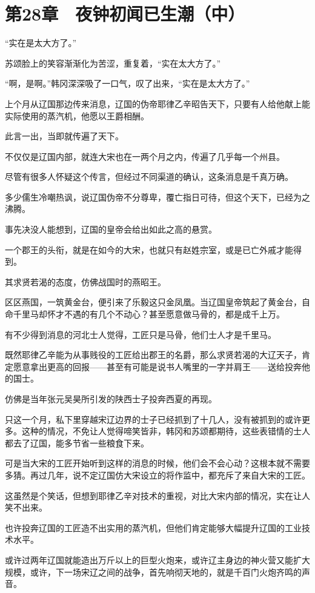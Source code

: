 \section{第28章　夜钟初闻已生潮（中）}

“实在是太大方了。”

苏颂脸上的笑容渐渐化为苦涩，重复着，“实在太大方了。”

“啊，是啊。”韩冈深深吸了一口气，叹了出来，“实在是太大方了。”

上个月从辽国那边传来消息，辽国的伪帝耶律乙辛昭告天下，只要有人给他献上能实际使用的蒸汽机，他愿以王爵相酬。

此言一出，当即就传遍了天下。

不仅仅是辽国内部，就连大宋也在一两个月之内，传遍了几乎每一个州县。

尽管有很多人怀疑这个传言，但经过不同渠道的确认，这条消息是千真万确。

多少儒生冷嘲热讽，说辽国伪帝不分尊卑，覆亡指日可待，但这个天下，已经为之沸腾。

事先决没人能想到，辽国的皇帝会给出如此之高的悬赏。

一个郡王的头衔，就是在如今的大宋，也就只有赵姓宗室，或是已亡外戚才能得到。

其求贤若渴的态度，仿佛战国时的燕昭王。

区区燕国，一筑黄金台，便引来了乐毅这只金凤凰。当辽国皇帝筑起了黄金台，自命千里马却怀才不遇的有几个不动心？甚至愿意做马骨的，都是成千上万。

有不少得到消息的河北士人觉得，工匠只是马骨，他们士人才是千里马。

既然耶律乙辛能为从事贱役的工匠给出郡王的名爵，那么求贤若渴的大辽天子，肯定愿意拿出更高的回报——甚至有可能是说书人嘴里的一字并肩王——送给投奔他的国士。

仿佛是当年张元吴昊所引发的陕西士子投奔西夏的再现。

只这一个月，私下里穿越宋辽边界的士子已经抓到了十几人，没有被抓到的或许更多。这种的情况，不免让人觉得啼笑皆非，韩冈和苏颂都期待，这些表错情的士人都去了辽国，能多节省一些粮食下来。

可是当大宋的工匠开始听到这样的消息的时候，他们会不会心动？这根本就不需要多猜。再过几年，说不定辽国仿大宋设立的将作监中，都充斥了来自大宋的工匠。

这虽然是个笑话，但想到耶律乙辛对技术的重视，对比大宋内部的情况，实在让人笑不出来。

也许投奔辽国的工匠造不出实用的蒸汽机，但他们肯定能够大幅提升辽国的工业技术水平。

或许过两年辽国就能造出万斤以上的巨型火炮来，或许辽主身边的神火营又能扩大规模，或许，下一场宋辽之间的战争，首先响彻天地的，就是千百门火炮齐鸣的声音。

